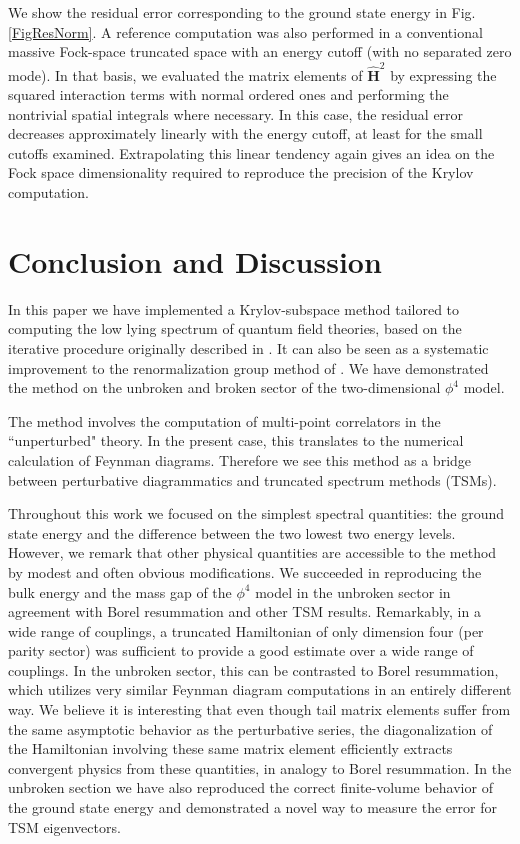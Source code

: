 \documentclass[twocolumn,secnumarabic,amssymb, nobibnotes, aps, prd]{revtex4-2}
\begin{document}
We show the residual error corresponding to the ground state energy in Fig. \ref{FigResNorm}. A reference computation was also performed in a conventional massive Fock-space truncated space with an energy cutoff (with no separated zero mode). In that basis, we evaluated the matrix elements of $\hat{\mathbf{H}}^2$ by expressing the squared interaction terms with normal ordered ones and performing the nontrivial spatial integrals where necessary. In this case, the residual error decreases approximately linearly with the energy cutoff, at least for the small cutoffs examined. Extrapolating this linear tendency again gives an idea on the Fock space dimensionality required to reproduce the precision of the Krylov computation.





\section{Conclusion and Discussion}

In this paper we have implemented a Krylov-subspace method tailored to computing the low lying spectrum of quantum field theories, based on the iterative procedure originally described in \cite{PhysRevA.28.2151}. It can also be seen as a systematic improvement to the renormalization
group method of \cite{Hogervorst:2014rta,Rychkov:2014eea,Elias-Miro:2017tup}. We have demonstrated the method on the unbroken and broken sector of the two-dimensional $\phi^4$ model.

The method involves the computation of multi-point correlators in the ``unperturbed" theory. In the present case, this translates to the numerical calculation of Feynman diagrams. Therefore we see this method as a bridge between perturbative diagrammatics and truncated spectrum methods (TSMs).

Throughout this work we focused on the simplest spectral quantities: the ground state energy and the difference between the two lowest two energy levels. However, we remark that other physical quantities are accessible to the method by modest and often obvious modifications.
We succeeded in reproducing the bulk energy and the mass gap of the $\phi^4$ model in the unbroken sector in agreement with Borel resummation and other TSM results. Remarkably, in a wide range of couplings, a truncated Hamiltonian of only dimension four (per parity sector) was sufficient to provide a good estimate over a wide range of couplings. In the unbroken sector, this can be contrasted to Borel resummation, which utilizes very similar Feynman diagram computations in an entirely different way. We believe it is interesting that even though tail matrix elements suffer from the same asymptotic behavior as the perturbative series, the diagonalization of the Hamiltonian involving these same matrix element efficiently extracts convergent physics from these quantities, in analogy to Borel resummation.
In the unbroken section we have also reproduced the correct finite-volume behavior of the ground state energy and demonstrated a novel way to measure the error for TSM eigenvectors. 
\end{document}
